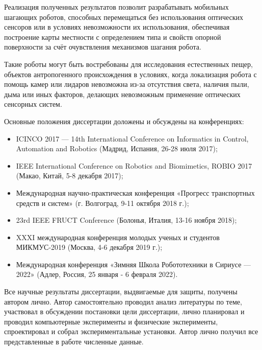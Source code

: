{\influence} Реализация полученных результатов позволит разрабатывать мобильных шагающих роботов, способных перемещаться без использования оптических сенсоров или в условиях невозможности их использования, обеспечивая построение карты местности с определением типа и свойств опорной поверхности за счёт очувствления механизмов шагания робота. 

Такие роботы могут быть востребованы для исследования естественных пещер, объектов антропогенного происхождения в условиях, когда локализация робота с помощь камер или лидаров невозможна из-за отсутствия света, наличия пыли, дыма или иных факторов, делающих невозможным применение оптических сенсорных систем.

{\probation}
Основные положения диссертации доложены и обсуждены на конференциях:
\begin{itemize}
  \item ICINCO 2017 — 14th International Conference on Informatics in Control, Automation and Robotics (Мадрид, Испания, 26-28 июля 2017);
  \item IEEE International Conference on Robotics and Biomimetics, ROBIO 2017 (Макао, Китай, 5-8 декабря 2017);
  \item  Международная научно-практическая конференция «Прогресс транспортных средств и систем» (г. Волгоград, 9-11 октября 2018 г.);
  \item 23rd IEEE FRUCT Conference (Болонья, Италия, 13-16 ноября 2018);
  \item XXXI международная конференция молодых ученых и студентов МИКМУС-2019 (Москва, 4-6 декабря 2019 г.);
  \item Международная конференция «Зимняя Школа Робототехники в Сириусе — 2022» (Адлер, Россия, 25 января - 6 февраля 2022).
\end{itemize}

{\contribution} Все научные результаты диссертации, выдвигаемые для защиты, получены автором лично. Автор самостоятельно проводил анализ литературы по теме, участвовал в обсуждении постановки цели диссертации, лично планировал и проводил компьютерные эксперименты и физические эксперименты, спроектировал и собрал экспериментальные установки. Автор лично получил все представленные в работе численные данные. 

